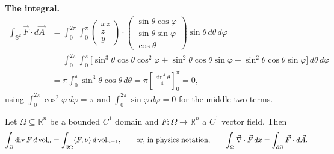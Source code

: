 \begin{example}
\textbf{The integral.}
\[
\begin{aligned}
\int_{\mathbb{S}^2} \vec F\cdot d\vec A
  &= \int_0^{2\pi}\!\!\int_0^\pi \begin{pmatrix}xz\\ z\\ y\end{pmatrix}\cdot
     \begin{pmatrix}\sin\theta\cos\varphi\\ \sin\theta\sin\varphi\\ \cos\theta\end{pmatrix}
     \sin\theta\,d\theta\,d\varphi \\
  &= \int_0^{2\pi}\!\!\int_0^\pi \Big[\sin^3\theta\cos\theta\cos^2\varphi
     + \sin^2\theta\cos\theta\sin\varphi + \sin^2\theta\cos\theta\sin\varphi\Big]\,d\theta\,
     d\varphi \\
  &= \pi\int_0^\pi \sin^3\theta\cos\theta\,d\theta
   = \pi\left[\frac{\sin^4\theta}{4}\right]_0^\pi = 0,
\end{aligned}
\]
using $\int_0^{2\pi}\cos^2\varphi\,d\varphi = \pi$ and $\int_0^{2\pi}\sin\varphi\,d\varphi=0$
for the middle two terms.
\end{example}

\begin{theorem}[Gauss]
\label{thm:gauss_divergence}
Let $\Omega \subseteq \mathbb{R}^n$ be a bounded $C^1$ domain and $F : \overline\Omega \to
\mathbb{R}^n$ a $C^1$ vector field. Then
\[\int_\Omega \operatorname{div} F\,d\operatorname{vol}_n = \int_{\partial\Omega} \langle F,\nu\rangle\,d\operatorname{vol}_{n-1},
  \qquad \text{or, in physics notation,} \qquad
  \int_\Omega \vec\nabla\cdot\vec F\,dx = \int_{\partial\Omega} \vec F\cdot d\vec A.\]
\end{theorem}


